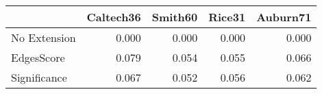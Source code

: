 \begin{tabular}{lrrrr}
\toprule
{} & Caltech36 & Smith60 & Rice31 & Auburn71 \\
\midrule
No Extension &     0.000 &   0.000 &  0.000 &    0.000 \\
EdgesScore   &     0.079 &   0.054 &  0.055 &    0.066 \\
Significance &     0.067 &   0.052 &  0.056 &    0.062 \\
\bottomrule
\end{tabular}
